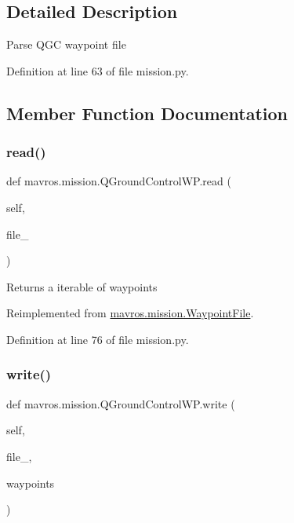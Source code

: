 \subsection{Detailed Description}
\begin{DoxyVerb}Parse QGC waypoint file\end{DoxyVerb}
 

Definition at line 63 of file mission.\+py.



\subsection{Member Function Documentation}
\mbox{\label{classmavros_1_1mission_1_1QGroundControlWP_a6b06e2e1e92496e9d0eeb304d2702181}} 
\subsubsection{\texorpdfstring{read()}{read()}}
{\footnotesize\ttfamily def mavros.\+mission.\+Q\+Ground\+Control\+W\+P.\+read (\begin{DoxyParamCaption}\item[{}]{self,  }\item[{}]{file\+\_\+ }\end{DoxyParamCaption})}

\begin{DoxyVerb}Returns a iterable of waypoints\end{DoxyVerb}
 

Reimplemented from \mbox{\hyperlink{classmavros_1_1mission_1_1WaypointFile_a36f785a3f53697cb369b6de9afd376d2}{mavros.\+mission.\+Waypoint\+File}}.



Definition at line 76 of file mission.\+py.

\mbox{\label{classmavros_1_1mission_1_1QGroundControlWP_a3ade3c33ce488e4f5fb361bfe7ff8e2d}} 
\subsubsection{\texorpdfstring{write()}{write()}}
{\footnotesize\ttfamily def mavros.\+mission.\+Q\+Ground\+Control\+W\+P.\+write (\begin{DoxyParamCaption}\item[{}]{self,  }\item[{}]{file\+\_\+,  }\item[{}]{waypoints }\end{DoxyParamCaption})}

